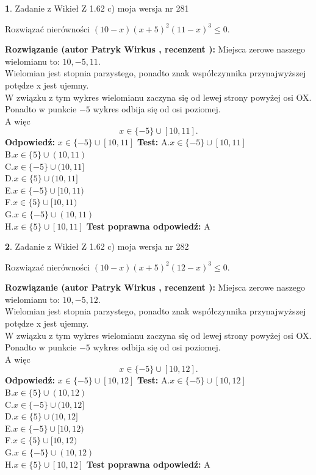 \documentclass[12pt, a4paper]{article}
\theoremstyle{definition} %
\newtheorem{zad}{}
\newcommand{\zadStart}[1]{\begin{zad}#1\newline}
\newcommand{\zadStop}{\end{zad}}
\newcommand{\rozwStart}[2]{\noindent \textbf{Rozwiązanie (autor #1 , recenzent #2): }\newline}
\newcommand{\rozwStop}{\newline}
\newcommand{\odpStart}{\noindent \textbf{Odpowiedź:}\newline}
\newcommand{\odpStop}{\newline}
\newcommand{\testStart}{\noindent \textbf{Test:}\newline}
\newcommand{\testStop}{\newline}
\newcommand{\kluczStart}{\noindent \textbf{Test poprawna odpowiedź:}\newline}
\newcommand{\kluczStop}{\newline}
\begin{document}
\zadStart{Zadanie z Wikieł Z 1.62 c) moja wersja nr 281}

Rozwiązać nierówności $(10-x)(x+5)^{2}(11-x)^{3}\le0$.
\zadStop
\rozwStart{Patryk Wirkus}{}
Miejsca zerowe naszego wielomianu to: $10, -5, 11$.\\
Wielomian jest stopnia parzystego, ponadto znak współczynnika przy\linebreak najwyższej potędze x jest ujemny.\\ W związku z tym wykres wielomianu zaczyna się od lewej strony powyżej osi OX.\\
Ponadto w punkcie $-5$ wykres odbija się od osi poziomej.\\
A więc $$x \in \{-5\} \cup [10,11].$$
\rozwStop
\odpStart
$x \in \{-5\} \cup [10,11]$
\odpStop
\testStart
A.$x \in \{-5\} \cup [10,11]$\\
B.$x \in \{5\} \cup (10,11)$\\
C.$x \in \{-5\} \cup (10,11]$\\
D.$x \in \{5\} \cup (10,11]$\\
E.$x \in \{-5\} \cup [10,11)$\\
F.$x \in \{5\} \cup [10,11)$\\
G.$x \in \{-5\} \cup (10,11)$\\
H.$x \in \{5\} \cup [10,11]$
\testStop
\kluczStart
A
\kluczStop



\zadStart{Zadanie z Wikieł Z 1.62 c) moja wersja nr 282}

Rozwiązać nierówności $(10-x)(x+5)^{2}(12-x)^{3}\le0$.
\zadStop
\rozwStart{Patryk Wirkus}{}
Miejsca zerowe naszego wielomianu to: $10, -5, 12$.\\
Wielomian jest stopnia parzystego, ponadto znak współczynnika przy\linebreak najwyższej potędze x jest ujemny.\\ W związku z tym wykres wielomianu zaczyna się od lewej strony powyżej osi OX.\\
Ponadto w punkcie $-5$ wykres odbija się od osi poziomej.\\
A więc $$x \in \{-5\} \cup [10,12].$$
\rozwStop
\odpStart
$x \in \{-5\} \cup [10,12]$
\odpStop
\testStart
A.$x \in \{-5\} \cup [10,12]$\\
B.$x \in \{5\} \cup (10,12)$\\
C.$x \in \{-5\} \cup (10,12]$\\
D.$x \in \{5\} \cup (10,12]$\\
E.$x \in \{-5\} \cup [10,12)$\\
F.$x \in \{5\} \cup [10,12)$\\
G.$x \in \{-5\} \cup (10,12)$\\
H.$x \in \{5\} \cup [10,12]$
\testStop
\kluczStart
A
\kluczStop
\end{document}
